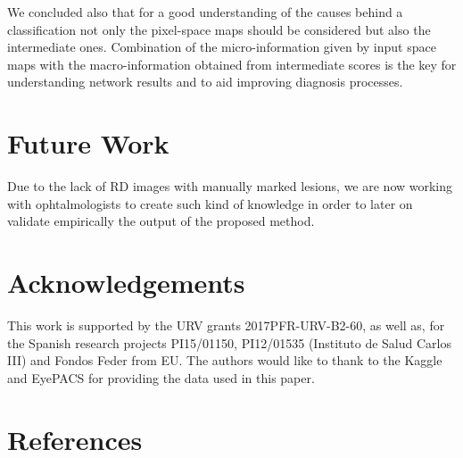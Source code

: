 \documentclass[review]{elsarticle}
\theoremstyle{definition} %
\theoremstyle{remark}
\begin{document}
We concluded also that for a good understanding of the causes behind a classification not only the pixel-space maps should be considered but also the intermediate ones. Combination of the micro-information given by input space maps with the macro-information obtained from intermediate scores is the key for understanding network results and to aid improving diagnosis processes.

\section{Future Work}

Due to the lack of RD images with manually marked lesions, we are now working with ophtalmologists to create such kind of knowledge in order to later on validate empirically the output of the proposed method.

\section*{Acknowledgements}
This work is supported by the URV grants 2017PFR-URV-B2-60, as well as, for the Spanish research projects PI15/01150, PI12/01535 (Instituto de Salud Carlos III) and Fondos Feder from EU. The authors would like to thank to the Kaggle and EyePACS for providing the data used in this paper.

\section*{References}


\end{document}
